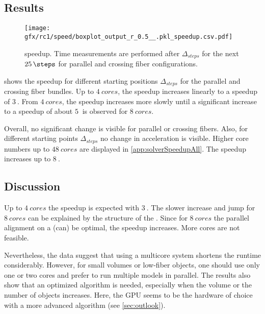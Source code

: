 \subsection{Results}
% 
\begin{figure}[!t]
\centering
\texttt{[image: gfx/rc1/speed/boxplot\_output\_r\_0.5\_\_.pkl\_speedup.csv.pdf]}
\caption{ speedup. Time measurements are performed after $\Delta_{\mathit{steps}}$ for the next $\SI{25}{\steps}$ for parallel \pfbs{} and crossing \cfbs{} fiber configurations.}
\label{fig:solverSpeedup}
\end{figure}
% 
 shows the speedup for different starting positions $\Delta_{\mathit{steps}}$ for the parallel \pfbs{} and crossing \cfbs{} fiber bundles.
Up to $\SI{4}{cores}$, the speedup increases linearly to a speedup of $\SI{3}{}$.
From $\SI{4}{cores}$, the speedup increases more slowly until a significant increase to a speedup of about $\SI{5}{}$ is observed for $\SI{8}{cores}$.
\par
% 
Overall, no significant change is visible for parallel or crossing fibers.
Also, for different starting points $\Delta_{\mathit{steps}}$ no change in acceleration is visible.
Higher core numbers up to $\SI{48}{cores}$ are displayed in \cref{app:solverSpeedupAll}.
The speedup increases up to $\SI{8}{}$.
% 
% 
% 
\subsection{Discussion}
% 
Up to $\SI{4}{cores}$ the speedup is expected with $\SI{3}{}$.
The slower increase and jump for $\SI{8}{cores}$ can be explained by the structure of the .
Since for $\SI{8}{cores}$ the parallel alignment on a  (can) be optimal, the speedup increases.
More cores are not feasible.
\par
% 
Nevertheless, the data suggest that using a multicore system shortens the runtime considerably.
However, for small volumes or low-fiber objects, one should use only one or two cores and prefer to run multiple models in parallel.
The results also show that an optimized algorithm is needed, especially when the volume or the number of objects increases.
Here, the \ac{GPU} seems to be the hardware of choice with a more advanced algorithm \cite{Karras2012} (see \cref{sec:outlook}).
